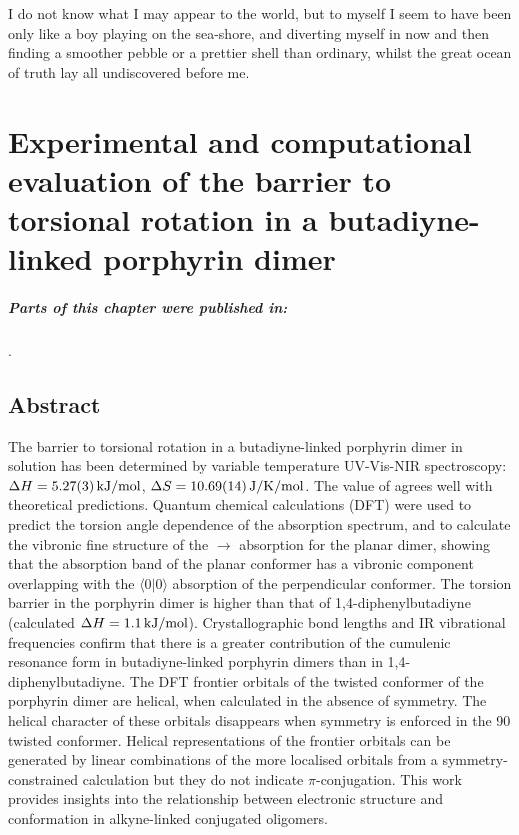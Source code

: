 \begin{savequote}[8cm]
I do not know what I may appear to the world, but to myself I seem to have been only like a boy playing on the sea-shore, and diverting myself in now and then finding a smoother pebble or a prettier shell than ordinary, whilst the great ocean of truth lay all undiscovered before me.
\end{savequote}


\chapter{\label{ch:dimer}Experimental and computational evaluation of the barrier to torsional rotation in a butadiyne-linked porphyrin dimer} 

\minitoc

\paragraph{Parts of this chapter were published in:} . 

\enlargethispage{-2\baselineskip} \pagebreak

\section{Abstract}
	The barrier to torsional rotation in a butadiyne-linked porphyrin dimer in solution has been determined by variable temperature UV-Vis-NIR spectroscopy: $\delh = \SI{5.27 \pm 0.03}{\kjmol}$, $\dels = \SI{10.69 \pm 0.14}{\jkmol}$. The value of \delh agrees well with theoretical predictions. Quantum chemical calculations (DFT) were used to predict the torsion angle dependence of the absorption spectrum, and to calculate the vibronic fine structure of the $\rightarrow{}$ absorption for the planar dimer, showing that the absorption band of the planar conformer has a vibronic component overlapping with the $\langle0|0\rangle$ absorption of the perpendicular conformer. The torsion barrier in the porphyrin dimer is higher than that of 1,4-diphenylbutadiyne (calculated $\delh = \SI{1.1}{\kjmol}$). Crystallographic bond lengths and IR vibrational frequencies confirm that there is a greater contribution of the cumulenic resonance form in butadiyne-linked porphyrin dimers than in 1,4-diphenylbutadiyne. The DFT frontier orbitals of the twisted conformer of the porphyrin dimer are helical, when calculated in the absence of symmetry. The helical character of these orbitals disappears when  symmetry is enforced in the 90\textdegree{} twisted conformer. Helical representations of the frontier orbitals can be generated by linear combinations of the more localised orbitals from a symmetry-constrained calculation but they do not indicate $\pi$-conjugation. This work provides insights into the relationship between electronic structure and conformation in alkyne-linked conjugated oligomers. 

